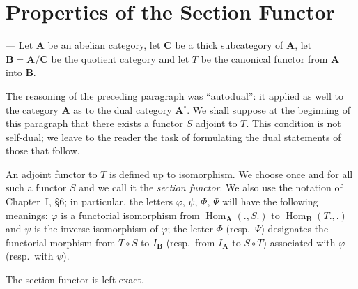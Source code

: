 %
%
%

\section{Properties of the Section Functor}

--- Let $\mathbf A$ be an abelian category, let $\mathbf C$ be a thick
subcategory of $\mathbf A$, let $\mathbf B=\mathbf A/\mathbf C$ be the
quotient category and let $T$ be the canonical functor from $\mathbf A$
into $\mathbf B$.

The reasoning of the preceding paragraph was ``autodual'': it applied as
well to the category $\mathbf A$ as to the dual category
$\mathbf A^{\circ}$. We shall suppose at the beginning of this paragraph
that there exists a functor $S$ adjoint to $T$. This condition is not
self-dual; we leave to the reader the task of formulating the dual
statements of those that follow.

An adjoint functor to $T$ is defined up to isomorphism. We choose once
and for all such a functor $S$ and we call it the \emph{section
functor}. We also use the notation of Chapter~I, \S6; in particular, the
letters $\varphi$, $\psi$, $\Phi$, $\Psi$ will have the following
meanings: $\varphi$ is a functorial isomorphism from
$\operatorname{Hom}_{\mathbf A}(.,S.)$ to
$\operatorname{Hom}_{\mathbf B}(T.,.)$ and $\psi$ is the inverse
isomorphism of $\varphi$; the letter $\Phi$ (resp.\ $\Psi$) designates
the functorial morphism from $T\circ S$ to $I_{\mathbf B}$ (resp.\ from
$I_{\mathbf A}$ to $S\circ T$) associated with $\varphi$ (resp.\ with
$\psi$).

\begin{proposition}
The section functor is left exact.
\end{proposition}

